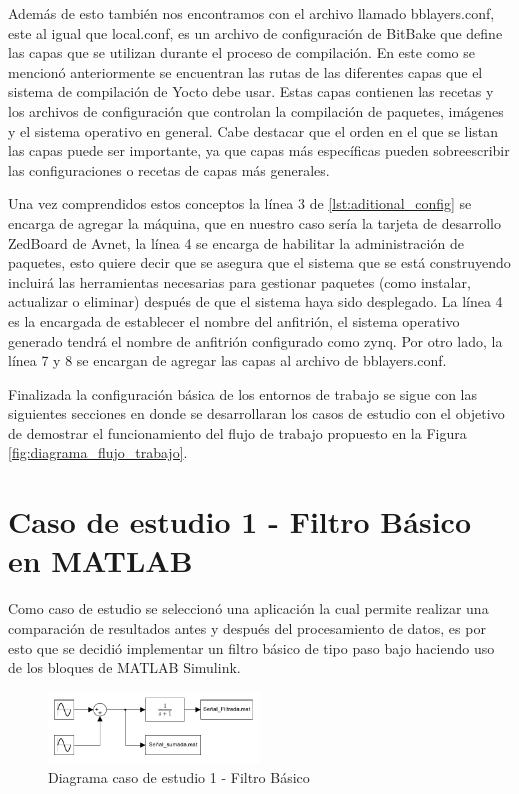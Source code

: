 Además de esto también nos encontramos con el archivo llamado bblayers.conf, este al igual que local.conf, es un archivo de configuración de BitBake que define las capas que se utilizan durante el proceso de compilación. En este como se mencionó anteriormente se encuentran las rutas de las diferentes capas que el sistema de compilación de Yocto debe usar. Estas capas contienen las recetas y los archivos de configuración que controlan la compilación de paquetes, imágenes y el sistema operativo en general. Cabe destacar que el orden en el que se listan las capas puede ser importante, ya que capas más específicas pueden sobreescribir las configuraciones o recetas de capas más generales.

Una vez comprendidos estos conceptos la línea 3 de \ref{lst:aditional_config} se encarga de agregar la máquina, que en nuestro caso sería la tarjeta de desarrollo ZedBoard de Avnet, la línea 4 se encarga de habilitar la administración de paquetes, esto quiere decir que se asegura que el sistema que se está construyendo incluirá las herramientas necesarias para gestionar paquetes (como instalar, actualizar o eliminar) después de que el sistema haya sido desplegado. La línea 4 es la encargada de establecer el nombre del anfitrión, el sistema operativo generado tendrá el nombre de anfitrión configurado como zynq. Por otro lado, la línea 7 y 8 se encargan de agregar las capas al archivo de bblayers.conf.

Finalizada la configuración básica de los entornos de trabajo se sigue con las siguientes secciones en donde se desarrollaran los casos de estudio con el objetivo de demostrar el funcionamiento del flujo de trabajo propuesto en la Figura \ref{fig:diagrama_flujo_trabajo}.

\section{Caso de estudio 1 - Filtro Básico en MATLAB}

Como caso de estudio se seleccionó una aplicación la cual permite realizar una comparación de resultados antes y después del procesamiento de datos, es por esto que se decidió implementar un filtro básico de tipo paso bajo haciendo uso de los bloques de MATLAB Simulink. 

\begin{figure}[h!]
    \centering
    \includegraphics[width=0.5\textwidth]{fig/especifico_2/CASO_ESTUDIO_FILTRO/Diagrama matlab simulink.pdf}
    \caption{Diagrama caso de estudio 1 - Filtro Básico}
    \label{fig:diagrama_matlab_simulink}
\end{figure}

